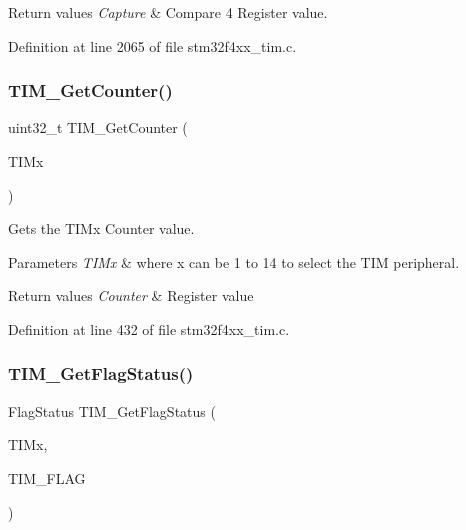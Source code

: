 \begin{DoxyRetVals}{Return values}
{\em Capture} & Compare 4 Register value. \\
\hline
\end{DoxyRetVals}


Definition at line 2065 of file stm32f4xx\+\_\+tim.\+c.

\mbox{\label{group___t_i_m_ga53607976e0866ab424e294cda9f6036e}} 
\subsubsection{\texorpdfstring{T\+I\+M\+\_\+\+Get\+Counter()}{TIM\_GetCounter()}}
{\footnotesize\ttfamily uint32\+\_\+t T\+I\+M\+\_\+\+Get\+Counter (\begin{DoxyParamCaption}\item[{\hyperlink{struct_t_i_m___type_def}{T\+I\+M\+\_\+\+Type\+Def} $\ast$}]{T\+I\+Mx }\end{DoxyParamCaption})}



Gets the T\+I\+Mx Counter value. 


\begin{DoxyParams}{Parameters}
{\em T\+I\+Mx} & where x can be 1 to 14 to select the T\+IM peripheral. \\
\hline
\end{DoxyParams}

\begin{DoxyRetVals}{Return values}
{\em Counter} & Register value \\
\hline
\end{DoxyRetVals}


Definition at line 432 of file stm32f4xx\+\_\+tim.\+c.

\mbox{\label{group___t_i_m_ga0adcbbd5e838ec8642e7a9b80075f41f}} 
\subsubsection{\texorpdfstring{T\+I\+M\+\_\+\+Get\+Flag\+Status()}{TIM\_GetFlagStatus()}}
{\footnotesize\ttfamily Flag\+Status T\+I\+M\+\_\+\+Get\+Flag\+Status (\begin{DoxyParamCaption}\item[{\hyperlink{struct_t_i_m___type_def}{T\+I\+M\+\_\+\+Type\+Def} $\ast$}]{T\+I\+Mx,  }\item[{uint16\+\_\+t}]{T\+I\+M\+\_\+\+F\+L\+AG }\end{DoxyParamCaption})}



